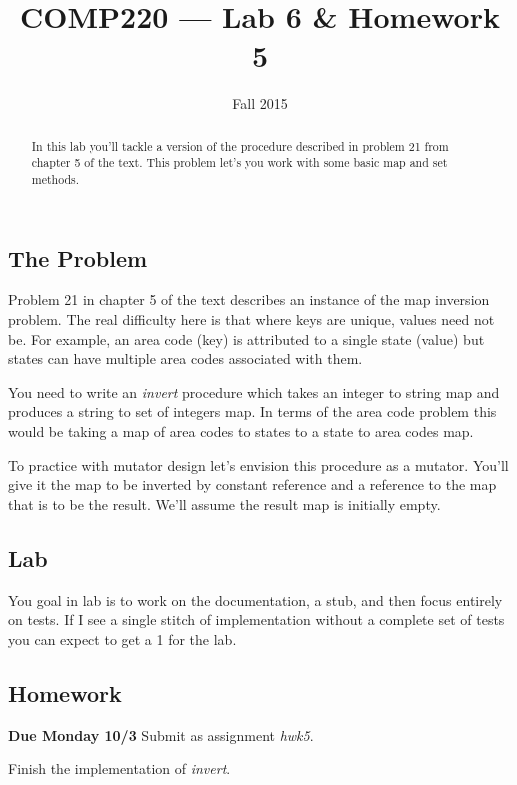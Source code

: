 \documentclass[10pt]{article}
\title{COMP220 --- Lab 6 \& Homework 5}
\author{ }
\date{Fall 2015}
\begin{document}
\maketitle

\begin{abstract}
In this lab you'll tackle a version of the procedure described in problem 21 from chapter 5 of the text. This problem let's you work with some basic map and set methods.
\end{abstract}

\subsection*{The Problem}

Problem 21 in chapter 5 of the text describes an instance of the map inversion problem. The real difficulty here is that where keys  are unique, values need not be.  For example, an area code (key) is attributed to a single state (value) but states can have multiple area codes associated with them.

You need to write an \textit{invert} procedure which takes an integer to string map and produces a string to set of integers map.  In terms of the area code problem this would be taking a map of area codes to states to a state to area codes map.

To practice with mutator design let's envision this procedure as a mutator. You'll give it the map to be inverted by constant reference and a reference to the map that is to be the result. We'll assume the result map is initially empty.

\subsection*{Lab}

You goal in lab is to work on the documentation, a stub, and then focus entirely on tests. If I see a single stitch of implementation without a complete set of tests you can expect to get a 1 for the lab.

\subsection*{Homework}

\begin{center}
  \textbf{Due Monday 10/3} Submit as assignment \textit{hwk5}.
\end{center}

Finish the implementation of \textit{invert}. 
\end{document}
